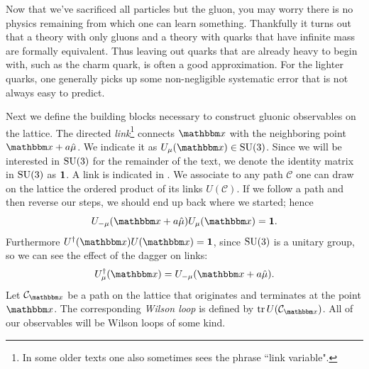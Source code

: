 Now that we've sacrificed all particles but the gluon, you may worry there is no
physics remaining from which one can learn something. Thankfully it turns out
that a theory with only gluons and a theory with quarks that have infinite mass
are formally equivalent. Thus leaving out quarks that are already heavy to begin
with, such as the charm quark, is often a good approximation. For the lighter
quarks, one generally picks up some non-negligible systematic error that is not 
always easy to predict. 

Next we define the building blocks necessary to construct gluonic observables on the
lattice. The directed {\it link}\footnote{In some older texts one
also sometimes sees the phrase ``link variable".} 
connects $\fvec{x}$ with the
neighboring point $\fvec{x}+a\hat{\mu}$. We indicate it as 
$U_\mu(\fvec{x})\in \SU(3)$. Since we will be interested in $\operatorname{SU}(3)$ for the
remainder of the text, we denote the identity matrix in $\operatorname{SU}(3)$ as ${\mathbf 1}$.
A link is
indicated in .
We associate to any path $\mathcal{C}$ one can draw on the lattice
the ordered product of its links  $U(\mathcal{C})$.
If we follow a path and then reverse our steps, we should end
up back where we started; hence
\begin{equation}
  U_{-\mu}(\fvec{x}+a\hat{\mu})U_\mu(\fvec{x})=\id.
\end{equation}
Furthermore $U^\dagger(\fvec{x})U(\fvec{x})=\id$, since $\operatorname{SU}(3)$ is a unitary
group, so we can see the effect
of the dagger on links:
\begin{equation}
  U_\mu^\dagger(\fvec{x})=U_{-\mu}(\fvec{x}+a\hat{\mu}).
\end{equation}
Let $\mathcal{C}_{\fvec{x}}$ be a path on the lattice that originates and
terminates at the point $\fvec{x}$. The corresponding {\it Wilson loop} is
defined by $\tr U(\mathcal{C}_{\fvec{x}})$.
All of our observables will be Wilson loops of some kind.

